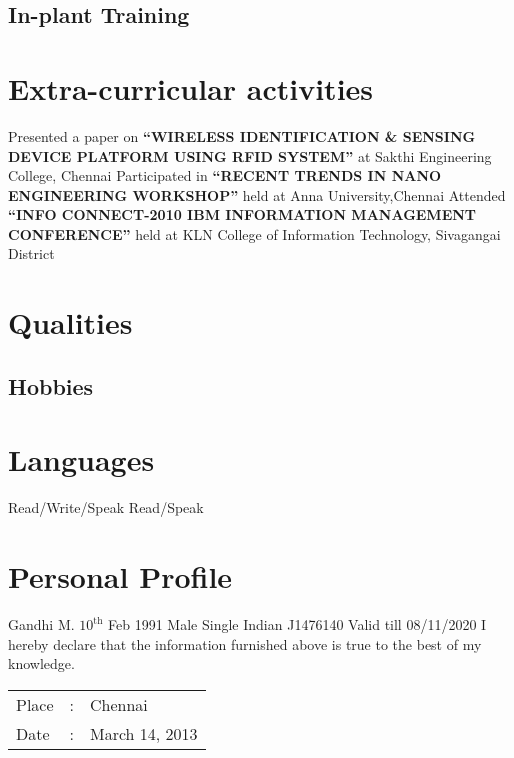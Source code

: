 \documentclass [a4paper,11pt]{moderncv}
\begin{document}
\subsection {In-plant Training}
\section {Extra-curricular activities}
\cvline {} {Presented a paper on \textbf{``WIRELESS IDENTIFICATION \& SENSING DEVICE PLATFORM USING RFID SYSTEM''} at Sakthi Engineering College, Chennai}
\cvline {} {Participated in \textbf{``RECENT TRENDS IN NANO ENGINEERING WORKSHOP''} held at Anna University,Chennai}
\cvline {} {Attended \textbf{``INFO CONNECT-2010 IBM INFORMATION MANAGEMENT CONFERENCE''} held at KLN College of Information Technology, Sivagangai District}

\section {Qualities}
\subsection{Hobbies}

\section{Languages}
 {Read/Write/Speak}
 {Read/Speak}

\section {Personal Profile}
 {Gandhi M.}
 {$10^{\mathrm{th}}$ Feb 1991}
 {Male}
 {Single}
 {Indian}
 {J1476140 Valid till 08/11/2020}
\vspace {4pt}
I hereby declare that the information furnished above is true to the best of my knowledge.\\

\begin{tabular}{|l c l|}
Place \hspace{4pt} &:& \hspace{2pt}Chennai\\
Date\hspace{4pt}  &:& \hspace{2pt}March 14, 2013 \\
\end{tabular}
\end{document}
